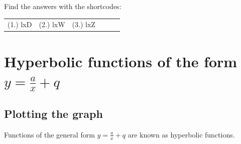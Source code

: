 \begin{exercises}{}
{\par {} Find the answers with the shortcodes:
\par \begin{tabular}[h]{cccccc}
(1.) lxD  &  (2.) lxW  &  (3.) lxZ  & \end{tabular}
}
\end{exercises}   

\section{Hyperbolic functions of the form $y=\frac{a}{x}+q$}


\subsection*{Plotting the graph}  
Functions of the general form $y=\frac{a}{x}+q$ are known as hyperbolic functions. 

